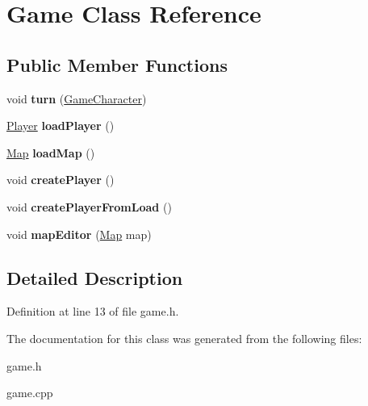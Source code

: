 \hypertarget{class_game}{}\section{Game Class Reference}
\label{class_game}
\subsection*{Public Member Functions}
\begin{DoxyCompactItemize}
\item 
\hypertarget{class_game_af04a043c997c34e9c4cd4fbb1db3ff73}{}\label{class_game_af04a043c997c34e9c4cd4fbb1db3ff73} 
void {\bfseries turn} (\hyperlink{class_game_character}{Game\+Character})
\item 
\hypertarget{class_game_a5d22cebed1061d51b2c3aaba2352972d}{}\label{class_game_a5d22cebed1061d51b2c3aaba2352972d} 
\hyperlink{class_player}{Player} {\bfseries load\+Player} ()
\item 
\hypertarget{class_game_ac7c8b111e2f09bbcf92a3da037992e57}{}\label{class_game_ac7c8b111e2f09bbcf92a3da037992e57} 
\hyperlink{class_map}{Map} {\bfseries load\+Map} ()
\item 
\hypertarget{class_game_a9e5b2d2156debcd958e2eae6fc79730a}{}\label{class_game_a9e5b2d2156debcd958e2eae6fc79730a} 
void {\bfseries create\+Player} ()
\item 
\hypertarget{class_game_a94515881419e23477226deba95dbb1f3}{}\label{class_game_a94515881419e23477226deba95dbb1f3} 
void {\bfseries create\+Player\+From\+Load} ()
\item 
\hypertarget{class_game_ac3276ead57322cccdeed919fd7f28b34}{}\label{class_game_ac3276ead57322cccdeed919fd7f28b34} 
void {\bfseries map\+Editor} (\hyperlink{class_map}{Map} map)
\end{DoxyCompactItemize}


\subsection{Detailed Description}


Definition at line 13 of file game.\+h.



The documentation for this class was generated from the following files\+:\begin{DoxyCompactItemize}
\item 
game.\+h\item 
game.\+cpp\end{DoxyCompactItemize}
